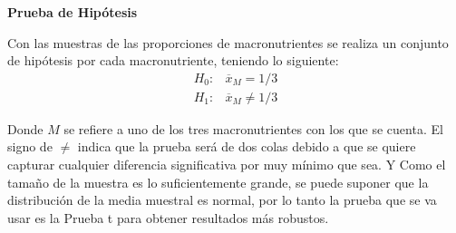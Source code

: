 \documentclass[12pt,a4paper]{article}
\begin{document}
        \textbf{Prueba de Hipótesis}\\ 
        {
            Con las muestras de las proporciones de macronutrientes se realiza 
            un conjunto de hipótesis por cada macronutriente, teniendo lo 
            siguiente:
            \begin{align*}
                H_0 :& \overline{x}_M = 1/3  \\
                H_1 :& \overline{x}_M \ne 1/3 
            \end{align*}
        
            Donde $M$ se refiere a uno de los tres macronutrientes con los que 
            se cuenta. El signo de $\ne$ indica que la prueba será de dos colas 
            debido a que se quiere capturar cualquier diferencia significativa 
            por muy mínimo que sea. Y Como el tamaño de la muestra es lo suficientemente 
            grande, se puede suponer que la distribución de la media muestral es 
            normal, por lo tanto la prueba que se va usar es la Prueba t para obtener 
            resultados más robustos.\\
        }
\end{document}
